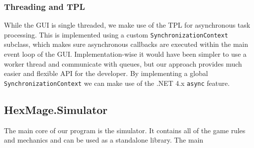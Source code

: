 \subsubsection{Threading and TPL}
\label{threading-tpl}

While the GUI is single threaded, we make use of the TPL for asynchronous task processing. This is implemented using a custom \verb|SynchronizationContext| subclass, which makes sure asynchronous callbacks are executed within the main event loop of the GUI. Implementation-wise it would have been simpler to use a worker thread and communicate with queues, but our approach provides much easier and flexible API for the developer. By implementing a global \verb|SynchronizationContext| we can make use of the .NET 4.x \verb|async| \citep{async} feature. 


\subsection{HexMage.Simulator}

The main core of our program is the simulator. It contains all of the game rules and mechanics and can be used as a standalone library. The main 